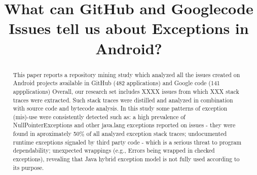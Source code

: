\documentclass[conference]{IEEEtran}
\begin{document}

\title{ What can GitHub and Googlecode Issues tell us about Exceptions in Android? }







\author{
}

\newcommand{\todo}[1]{\textbf{TODO}\footnote{\textbf{TODO:} #1}}

\maketitle

\begin{abstract}





This paper reports a repository mining study which analyzed all the issues created on
 Android projects available in GitHub (482 applications) and Google code (141 appplications)
Overall, our research set includes XXXX issues from which XXX stack traces 
were extracted. Such stack traces were distilled and analyzed in 
combination with source code and bytecode analysis. In this study some patterns of exception
(mis)-use were consistently detected such as: a high prevalence of NullPointerExceptions and 
other java.lang exceptions reported on issues - they were found in aproximately 50\% of all analyzed 
exception stack traces; undocumented runtime exceptions signaled by third party code - which is a serious threat to program
dependability; unexpected wrappings (e.g., Errors being wrapped in checked exceptions), revealing that Java hybrid exception
model is not fully used according to its purpose.

\end{abstract}
\end{document}
